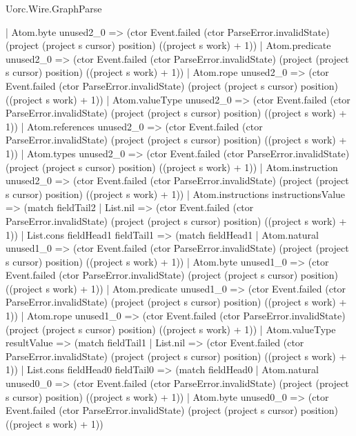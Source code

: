 \begin{lexlean}{Uorc.Wire.GraphParse}
\begin{semanticmodule}
{              | Atom.byte unused2_0 => (ctor Event.failed (ctor ParseError.invalidState) (project (project s cursor) position) ((project s work) + 1))
              | Atom.predicate unused2_0 => (ctor Event.failed (ctor ParseError.invalidState) (project (project s cursor) position) ((project s work) + 1))
              | Atom.rope unused2_0 => (ctor Event.failed (ctor ParseError.invalidState) (project (project s cursor) position) ((project s work) + 1))
              | Atom.valueType unused2_0 => (ctor Event.failed (ctor ParseError.invalidState) (project (project s cursor) position) ((project s work) + 1))
              | Atom.references unused2_0 => (ctor Event.failed (ctor ParseError.invalidState) (project (project s cursor) position) ((project s work) + 1))
              | Atom.types unused2_0 => (ctor Event.failed (ctor ParseError.invalidState) (project (project s cursor) position) ((project s work) + 1))
              | Atom.instruction unused2_0 => (ctor Event.failed (ctor ParseError.invalidState) (project (project s cursor) position) ((project s work) + 1))
              | Atom.instructions instructionsValue => (match fieldTail2
                | List.nil => (ctor Event.failed (ctor ParseError.invalidState) (project (project s cursor) position) ((project s work) + 1))
                | List.cons fieldHead1 fieldTail1 => (match fieldHead1
                  | Atom.natural unused1_0 => (ctor Event.failed (ctor ParseError.invalidState) (project (project s cursor) position) ((project s work) + 1))
                  | Atom.byte unused1_0 => (ctor Event.failed (ctor ParseError.invalidState) (project (project s cursor) position) ((project s work) + 1))
                  | Atom.predicate unused1_0 => (ctor Event.failed (ctor ParseError.invalidState) (project (project s cursor) position) ((project s work) + 1))
                  | Atom.rope unused1_0 => (ctor Event.failed (ctor ParseError.invalidState) (project (project s cursor) position) ((project s work) + 1))
                  | Atom.valueType resultValue => (match fieldTail1
                    | List.nil => (ctor Event.failed (ctor ParseError.invalidState) (project (project s cursor) position) ((project s work) + 1))
                    | List.cons fieldHead0 fieldTail0 => (match fieldHead0
                      | Atom.natural unused0_0 => (ctor Event.failed (ctor ParseError.invalidState) (project (project s cursor) position) ((project s work) + 1))
                      | Atom.byte unused0_0 => (ctor Event.failed (ctor ParseError.invalidState) (project (project s cursor) position) ((project s work) + 1))
}
\end{semanticmodule}
\end{lexlean}

